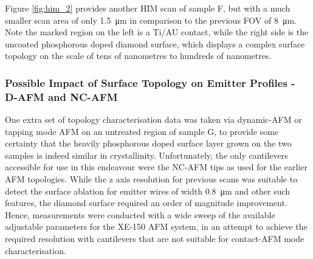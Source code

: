 \begin{refsection}
Figure \ref{fig:him_2} provides another HIM scan of sample F, but with a much smaller scan area of only 1.5~\si{\micro\metre} in comparison to the previous FOV of 8~\si{\micro\metre}. Note the marked region on the left is a Ti/AU contact, while the right side is the uncoated phosphorous doped diamond surface, which displays a complex surface topology on the scale of tens of nanometres to hundreds of nanometres.

\subsubsection{Possible Impact of Surface Topology on Emitter Profiles - D-AFM and NC-AFM}
One extra set of topology characterisation data was taken via dynamic-AFM or tapping mode AFM on an untreated region of sample G, to provide some certainty that the heavily phosphorous doped surface layer grown on the two samples is indeed similar in crystallinity. Unfortunately, the only cantilevers accessible for use in this endeavour were the NC-AFM tips as used for the earlier AFM topologies. While the z axis resolution for previous scans was suitable to detect the surface ablation for emitter wires of width 0.8~\si{\micro\metre} and other such features, the diamond surface required an order of magnitude improvement. Hence, measurements were conducted with a wide sweep of the available adjustable parameters for the XE-150 AFM system, in an attempt to achieve the required resolution with cantilevers that are not suitable for contact-AFM mode characterisation.


\end{refsection}
